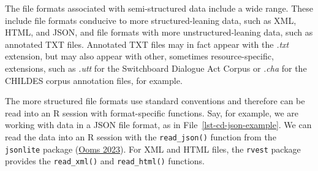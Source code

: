 \documentclass[
  letterpaper,
  DIV=11,
  numbers=noendperiod]{scrreport}
\theoremstyle{definition}
\theoremstyle{remark}
\begin{document}
The file formats associated with semi-structured data include a wide
range. These include file formats conducive to more structured-leaning
data, such as XML, HTML, and JSON, and file formats with more
unstructured-leaning data, such as annotated TXT files. Annotated TXT
files may in fact appear with the \emph{.txt} extension, but may also
appear with other, sometimes resource-specific, extensions, such as
\emph{.utt} for the Switchboard Dialogue Act Corpus or \emph{.cha} for
the CHILDES corpus annotation files, for example.

The more structured file formats use standard conventions and therefore
can be read into an R session with format-specific functions. Say, for
example, we are working with data in a JSON file format, as in
File~\ref{lst-cd-json-example}. We can read the data into an R session
with the \texttt{read\_json()} function from the \texttt{jsonlite}
package (\protect\hyperlink{ref-R-jsonlite}{Ooms 2023}). For XML and
HTML files, the \texttt{rvest} package provides the \texttt{read\_xml()}
and \texttt{read\_html()} functions.
\end{document}
